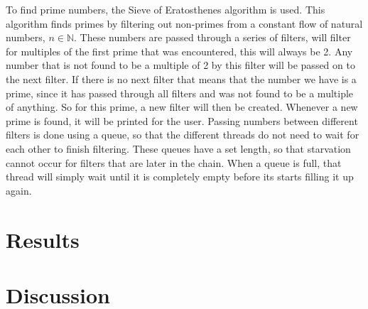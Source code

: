 \documentclass[a4paper,12px]{article}
\begin{document}
To find prime numbers, the Sieve of Eratosthenes algorithm is used. This
algorithm finds primes by filtering out non-primes from a constant flow of
natural numbers, $n \in \mathbb{N}$. These numbers are passed through a series
of filters, will filter for multiples of the first prime that was encountered,
this will always be 2. Any number that is not found to be a multiple of 2 by
this filter will be passed on to the next filter. If there is no next filter
that means that the number we have is a prime, since it has passed through all
filters and was not found to be a multiple of anything. So for this prime, a new
filter will then be created. Whenever a new prime is found, it will be printed
for the user. Passing numbers between different filters is done using a queue,
so that the different threads do not need to wait for each other to finish
filtering. These queues have a set length, so that starvation cannot occur for
filters that are later in the chain. When a queue is full, that thread will
simply wait until it is completely empty before its starts filling it up again.



\section{Results}


\section{Discussion}


%
%
\end{document}
